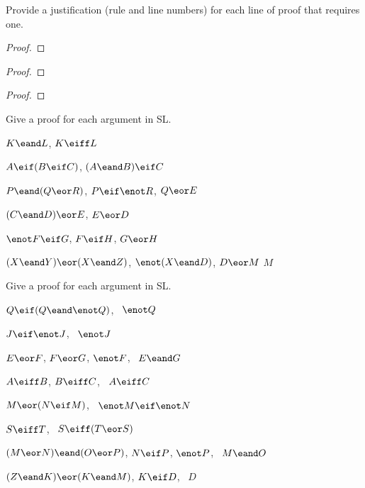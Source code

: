 

\practiceproblems

\solutions
\problempart
\label{pr.justifySLproof}
Provide a justification (rule and line numbers) for each line of proof that requires one.
\begin{multicols}{2}
\begin{proof}
 {}
 {}
\end{proof}

\begin{proof}
\open
\close
{}
\end{proof}

\begin{proof}
\open
	 {}
	\open
	\close
\close
{}
\end{proof}
\end{multicols}

\solutions
\problempart
\label{pr.solvedSLproofs}
Give a proof for each argument in SL.
\begin{earg}
\item $K\eand L$, \therefore $K\eiff L$
\item $A\eif (B\eif C)$, \therefore $(A\eand B)\eif C$
\item $P \eand (Q\eor R)$, $P\eif \enot R$, \therefore $Q\eor E$
\item $(C\eand D)\eor E$, \therefore $E\eor D$
\item $\enot F\eif G$, $F\eif H$, \therefore $G\eor H$
\item $(X\eand Y)\eor(X\eand Z)$, $\enot(X\eand D)$, $D\eor M$ \therefore $M$
\end{earg}

\problempart
Give a proof for each argument in SL.
\begin{earg}
\item $Q\eif(Q\eand\enot Q)$, \therefore\ $\enot Q$
\item $J\eif\enot J$, \therefore\ $\enot J$
\item $E\eor F$, $F\eor G$, $\enot F$, \therefore\ $E \eand G$
\item $A\eiff B$, $B\eiff C$, \therefore\ $A\eiff C$
\item $M\eor(N\eif M)$, \therefore\ $\enot M \eif \enot N$
\item $S\eiff T$, \therefore\ $S\eiff (T\eor S)$
\item $(M \eor N) \eand (O \eor P)$, $N \eif P$, $\enot P$, \therefore\ $M\eand O$
\item $(Z\eand K) \eor (K\eand M)$, $K \eif D$, \therefore\ $D$
\end{earg}



